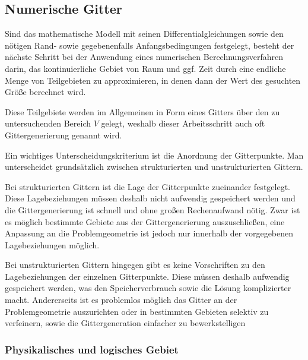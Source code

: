\subsection{Numerische Gitter}
\label{sec:num_gitter}

Sind das mathematische Modell mit seinen Differentialgleichungen sowie den nötigen
Rand- sowie gegebenenfalls Anfangsbedingungen festgelegt, besteht der nächste Schritt
bei der Anwendung eines numerischen Berechnungsverfahren darin, das kontinuierliche
Gebiet von Raum und ggf. Zeit durch eine endliche Menge von Teilgebieten zu approximieren,
in denen dann der Wert des gesuchten Größe berechnet wird.

Diese Teilgebiete werden im Allgemeinen in Form eines Gitters über den zu untersuchenden
Bereich $V$ gelegt, weshalb dieser Arbeitsschritt auch oft Gittergenerierung genannt wird.

Ein wichtiges Unterscheidungskriterium ist die Anordnung der Gitterpunkte.
Man unterscheidet grundsätzlich zwischen strukturierten und unstrukturierten Gittern.

Bei strukturierten Gittern ist die Lage der Gitterpunkte zueinander festgelegt. Diese
Lagebeziehungen müssen deshalb nicht aufwendig gespeichert werden und die Gittergenerierung
ist schnell und ohne großen Rechenaufwand nötig. Zwar ist es möglich bestimmte Gebiete
aus der Gittergenerierung auszuschließen, eine Anpassung an die Problemgeometrie ist
jedoch nur innerhalb der vorgegebenen Lagebeziehungen möglich.

Bei unstrukturierten Gittern hingegen gibt es keine Vorschriften zu den Lagebeziehungen
der einzelnen Gitterpunkte. Diese müssen deshalb aufwendig gespeichert werden, was
den Speicherverbrauch sowie die Lösung komplizierter macht. Andererseits ist es problemlos möglich
das Gitter an der Problemgeometrie auszurichten oder in bestimmten Gebieten selektiv zu verfeinern,
sowie die Gittergeneration einfacher zu bewerkstelligen

\subsubsection{Physikalisches und logisches Gebiet}

